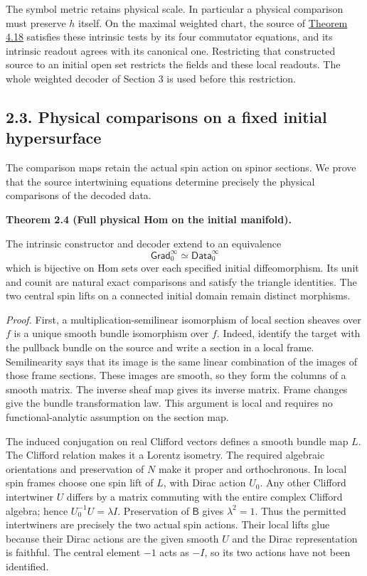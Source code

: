 \documentclass[
  english,
  11pt,
  reqno]{amsart}
\makeatletter
\newcommand{\pandocstatementheading}[1]{%
  \par\if@nobreak\else
    \addpenalty{\@beginparpenalty}%
    \addvspace{.5\baselineskip plus .2\baselineskip minus .2\baselineskip}%
  \fi
  {\normalfont\bfseries #1\par}%
  \nobreak\@afterindenttrue\@afterheading
}
\makeatother
\begin{document}
The symbol metric retains physical scale. In particular a physical
comparison must preserve \(h\) itself. On the maximal weighted chart,
the source of
\hyperref[thm:online-ordinary-negative-response-initial-source]{Theorem
4.18} satisfies these intrinsic tests by its four commutator equations,
and its intrinsic readout agrees with its canonical one. Restricting
that constructed source to an initial open set restricts the fields and
these local readouts. The whole weighted decoder of Section 3 is used
before this restriction.

\subsection{2.3. Physical comparisons on a fixed initial
hypersurface}\label{physical-comparisons-on-a-fixed-initial-hypersurface}\label{sec:online-initial-physical-comparisons}

The comparison maps retain the actual spin action on spinor sections. We
prove that the source intertwining equations determine precisely the
physical comparisons of the decoded data.

\pandocstatementheading{\leavevmode{}\label{thm:online-initial-gradient-full-hom}Theorem 2.4 (Full physical Hom on the initial manifold).}

The intrinsic constructor and decoder extend to an equivalence%
 \[
\mathsf{Grad}_0^\infty\simeq\mathsf{Data}_0^\infty
\] which is bijective on Hom sets over each specified initial
diffeomorphism. Its unit and counit are natural exact comparisons and
satisfy the triangle identities. The two central spin lifts on a
connected initial domain remain distinct morphisms.

\emph{Proof.} First, a multiplication-semilinear isomorphism of local
section sheaves over \(f\) is a unique smooth bundle isomorphism over
\(f\). Indeed, identify the target with the pullback bundle on the
source and write a section in a local frame. Semilinearity says that its
image is the same linear combination of the images of those frame
sections. These images are smooth, so they form the columns of a smooth
matrix. The inverse sheaf map gives its inverse matrix. Frame changes
give the bundle transformation law. This argument is local and requires
no functional-analytic assumption on the section map.

The induced conjugation on real Clifford vectors defines a smooth bundle
map \(L\). The Clifford relation makes it a Lorentz isometry. The
required algebraic orientations and preservation of \(N\) make it proper
and orthochronous. In local spin frames choose one spin lift of \(L\),
with Dirac action \(U_0\). Any other Clifford intertwiner \(U\) differs
by a matrix commuting with the entire complex Clifford algebra; hence
\(U_0^{-1}U=\lambda I\). Preservation of \(\mathsf B\) gives
\(\lambda^2=1\). Thus the permitted intertwiners are precisely the two
actual spin actions. Their local lifts glue because their Dirac actions
are the given smooth \(U\) and the Dirac representation is faithful. The
central element \(-1\) acts as \(-I\), so its two actions have not been
identified.
\end{document}
